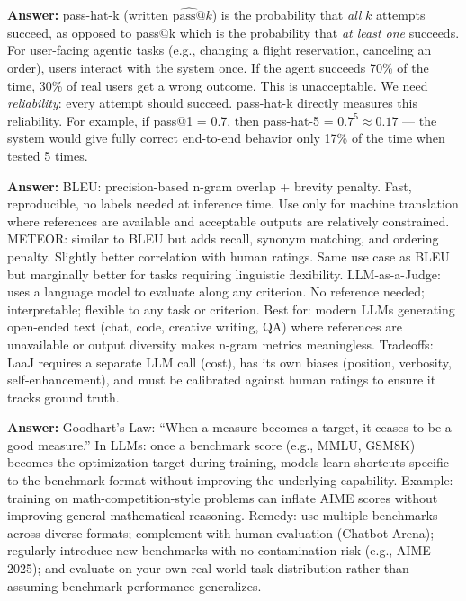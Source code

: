 \documentclass[11pt, a4paper]{article}
\begin{document}
\begin{notebox}
\textbf{Answer:} pass-hat-k (written $\widehat{\text{pass@}}k$) is the probability that \emph{all} $k$ attempts succeed, as opposed to pass@k which is the probability that \emph{at least one} succeeds. For user-facing agentic tasks (e.g., changing a flight reservation, canceling an order), users interact with the system once. If the agent succeeds 70\% of the time, 30\% of real users get a wrong outcome. This is unacceptable. We need \emph{reliability}: every attempt should succeed. pass-hat-k directly measures this reliability. For example, if pass@1 = 0.7, then pass-hat-5 = $0.7^5 \approx 0.17$ --- the system would give fully correct end-to-end behavior only 17\% of the time when tested 5 times.
\end{notebox}

\begin{notebox}
\textbf{Answer:} BLEU: precision-based n-gram overlap + brevity penalty. Fast, reproducible, no labels needed at inference time. Use only for machine translation where references are available and acceptable outputs are relatively constrained. METEOR: similar to BLEU but adds recall, synonym matching, and ordering penalty. Slightly better correlation with human ratings. Same use case as BLEU but marginally better for tasks requiring linguistic flexibility. LLM-as-a-Judge: uses a language model to evaluate along any criterion. No reference needed; interpretable; flexible to any task or criterion. Best for: modern LLMs generating open-ended text (chat, code, creative writing, QA) where references are unavailable or output diversity makes n-gram metrics meaningless. Tradeoffs: LaaJ requires a separate LLM call (cost), has its own biases (position, verbosity, self-enhancement), and must be calibrated against human ratings to ensure it tracks ground truth.
\end{notebox}

\begin{notebox}
\textbf{Answer:} Goodhart's Law: ``When a measure becomes a target, it ceases to be a good measure.'' In LLMs: once a benchmark score (e.g., MMLU, GSM8K) becomes the optimization target during training, models learn shortcuts specific to the benchmark format without improving the underlying capability. Example: training on math-competition-style problems can inflate AIME scores without improving general mathematical reasoning. Remedy: use multiple benchmarks across diverse formats; complement with human evaluation (Chatbot Arena); regularly introduce new benchmarks with no contamination risk (e.g., AIME 2025); and evaluate on your own real-world task distribution rather than assuming benchmark performance generalizes.
\end{notebox}
\end{document}
